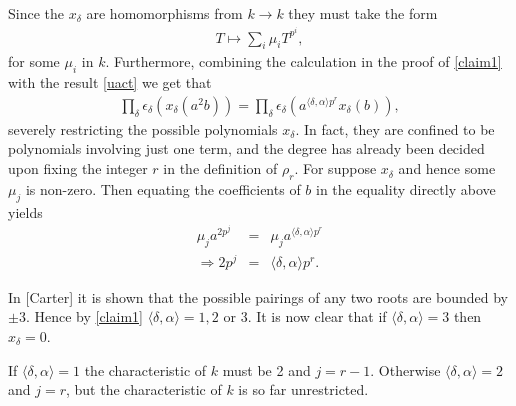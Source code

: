 Since the $x_\delta$ are homomorphisms from $k\rightarrow k$ they must take the form
\begin{eqnarray*}
T\mapsto\sum_i \mu_i T^{p^i},
\end{eqnarray*}
for some $\mu_i$ in $k$. Furthermore, combining the calculation in the proof of \ref{claim1} with the result \ref{uact} we get that
\begin{eqnarray*}
\prod_\delta \epsilon_\delta\left(x_\delta\left(a^2b\right)\right) = \prod_\delta \epsilon_\delta\left(a^{\langle \delta, \alpha \rangle p^r}x_\delta\left(b\right)\right),
\end{eqnarray*}
severely restricting the possible polynomials $x_\delta$. In fact, they are confined to be polynomials involving just one term, and the degree has already been decided upon fixing the integer $r$ in the definition of $\rho_r$. For suppose $x_\delta$ and hence some $\mu_j$ is non-zero. Then equating the coefficients of $b$ in the equality directly above yields
\begin{eqnarray*}
\mu_ja^{2p^j} &=& \mu_j a^{\langle \delta, \alpha \rangle p^r}\\
\Longrightarrow2p^j &=& \langle \delta, \alpha \rangle p^r.
\end{eqnarray*}

In [Carter] it is shown that the possible pairings of any two roots are bounded by $\pm 3$. Hence by \ref{claim1} $\langle \delta, \alpha \rangle = 1, 2$ or 3. It is now clear that if $\langle \delta, \alpha \rangle = 3$ then $x_\delta = 0$.

If $\langle \delta, \alpha \rangle = 1$ the characteristic of $k$ must be 2 and $j = r-1$. Otherwise $\langle \delta, \alpha \rangle = 2$ and $j = r$, but the characteristic of $k$ is so far unrestricted.


